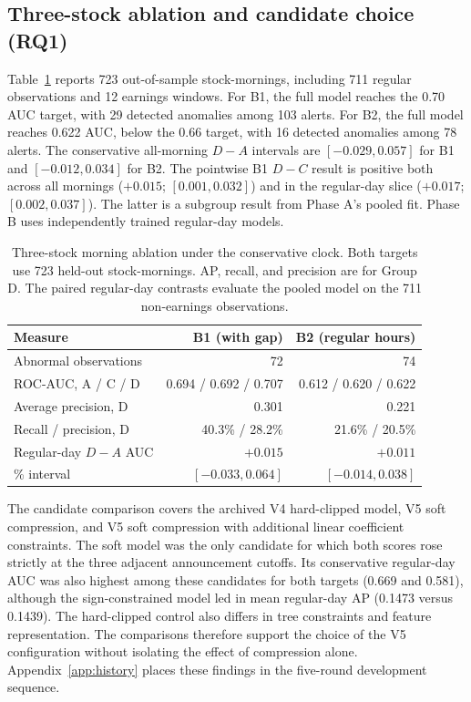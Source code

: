 \documentclass{article}
\begin{document}
\subsection{Three-stock ablation and candidate choice (RQ1)}

Table~\ref{tab:v5_core} reports 723 out-of-sample stock-mornings, including 711 regular observations and 12 earnings windows. For B1, the full model reaches the 0.70 AUC target, with 29 detected anomalies among 103 alerts. For B2, the full model reaches 0.622 AUC, below the 0.66 target, with 16 detected anomalies among 78 alerts. The conservative all-morning $D-A$ intervals are $[-0.029,0.057]$ for B1 and $[-0.012,0.034]$ for B2. The pointwise B1 $D-C$ result is positive both across all mornings ($+0.015$; $[0.001,0.032]$) and in the regular-day slice ($+0.017$; $[0.002,0.037]$). The latter is a subgroup result from Phase A's pooled fit. Phase B uses independently trained regular-day models.

\begin{table}[htbp]
 \caption{Three-stock morning ablation under the conservative clock. Both targets use 723 held-out stock-mornings. AP, recall, and precision are for Group D. The paired regular-day contrasts evaluate the pooled model on the 711 non-earnings observations.}
 \label{tab:v5_core}
 \centering
 \begin{tabular}{@{}lrr@{}}
 \toprule
 Measure & B1 (with gap) & B2 (regular hours) \\
 \midrule
 Abnormal observations & 72 & 74 \\
 ROC-AUC, A / C / D & 0.694 / 0.692 / 0.707 & 0.612 / 0.620 / 0.622 \\
 Average precision, D & 0.301 & 0.221 \\
 Recall / precision, D & 40.3\% / 28.2\% & 21.6\% / 20.5\% \\
 Regular-day $D-A$ AUC & $+0.015$ & $+0.011$ \\
 \quad 95\% interval & $[-0.033,0.064]$ & $[-0.014,0.038]$ \\
 \bottomrule
 \end{tabular}
\end{table}

The candidate comparison covers the archived V4 hard-clipped model, V5 soft compression, and V5 soft compression with additional linear coefficient constraints. The soft model was the only candidate for which both scores rose strictly at the three adjacent announcement cutoffs. Its conservative regular-day AUC was also highest among these candidates for both targets (0.669 and 0.581), although the sign-constrained model led in mean regular-day AP (0.1473 versus 0.1439). The hard-clipped control also differs in tree constraints and feature representation. The comparisons therefore support the choice of the V5 configuration without isolating the effect of compression alone. Appendix~\ref{app:history} places these findings in the five-round development sequence.
\end{document}
